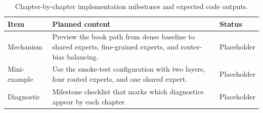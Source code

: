 \begin{table}[H]
\centering
\caption{Chapter-by-chapter implementation milestones and expected code outputs.}
\label{tab:ch01-the-minideepseekmoe-build-ladder}
\begin{tabularx}{\textwidth}{p{}X p{}}
\toprule
Item & Planned content & Status \\
\midrule
Mechanism & Preview the book path from dense baseline to shared experts, fine-grained experts, and router-bias balancing. & Placeholder \\
Mini-example & Use the smoke-test configuration with two layers, four routed experts, and one shared expert. & Placeholder \\
Diagnostic & Milestone checklist that marks which diagnostics appear by each chapter. & Placeholder \\
\bottomrule
\end{tabularx}
\end{table}
